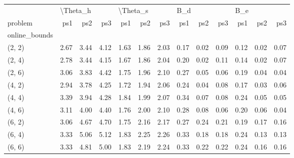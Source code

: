 \begin{tabular}{lrrrrrrrrrrrr}
\toprule
{} & \multicolumn{3}{l}{\textbackslash Theta\_h} & \multicolumn{3}{l}{\textbackslash Theta\_s} & \multicolumn{3}{l}{B\_d} & \multicolumn{3}{l}{B\_e} \\
problem &      ps1 &  ps2 &  ps3 &      ps1 &  ps2 &  ps3 &  ps1 &  ps2 &  ps3 &  ps1 &  ps2 &  ps3 \\
online\_bounds &          &      &      &          &      &      &      &      &      &      &      &      \\
\midrule
(2, 2)        &     2.67 & 3.44 & 4.12 &     1.63 & 1.86 & 2.03 & 0.17 & 0.02 & 0.09 & 0.12 & 0.02 & 0.07 \\
(2, 4)        &     2.78 & 3.44 & 4.15 &     1.67 & 1.86 & 2.04 & 0.20 & 0.02 & 0.11 & 0.14 & 0.02 & 0.07 \\
(2, 6)        &     3.06 & 3.83 & 4.42 &     1.75 & 1.96 & 2.10 & 0.27 & 0.05 & 0.06 & 0.19 & 0.04 & 0.04 \\
(4, 2)        &     2.94 & 3.78 & 4.25 &     1.72 & 1.94 & 2.06 & 0.24 & 0.04 & 0.08 & 0.17 & 0.03 & 0.06 \\
(4, 4)        &     3.39 & 3.94 & 4.28 &     1.84 & 1.99 & 2.07 & 0.34 & 0.07 & 0.08 & 0.24 & 0.05 & 0.05 \\
(4, 6)        &     3.11 & 4.00 & 4.40 &     1.76 & 2.00 & 2.10 & 0.28 & 0.08 & 0.06 & 0.20 & 0.06 & 0.04 \\
(6, 2)        &     3.06 & 4.67 & 4.70 &     1.75 & 2.16 & 2.17 & 0.27 & 0.24 & 0.21 & 0.19 & 0.17 & 0.16 \\
(6, 4)        &     3.33 & 5.06 & 5.12 &     1.83 & 2.25 & 2.26 & 0.33 & 0.18 & 0.18 & 0.24 & 0.13 & 0.13 \\
(6, 6)        &     3.33 & 4.81 & 5.00 &     1.83 & 2.19 & 2.24 & 0.33 & 0.22 & 0.22 & 0.24 & 0.16 & 0.16 \\
\bottomrule
\end{tabular}
